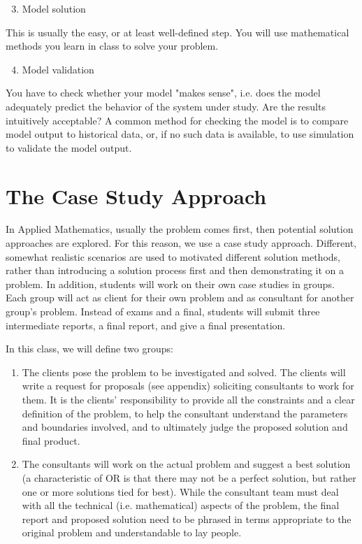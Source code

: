 \documentclass[10pt]{article}
\begin{document}
\begin{enumerate}
  \setcounter{enumi}{2}
  \item Model solution
\end{enumerate}
This is usually the easy, or at least well-defined step. You will use mathematical methods you learn in class to solve your problem.

\begin{enumerate}
  \setcounter{enumi}{3}
  \item Model validation
\end{enumerate}
You have to check whether your model "makes sense", i.e. does the model adequately predict the behavior of the system under study. Are the results intuitively acceptable? A common method for checking the model is to compare model output to historical data, or, if no such data is available, to use simulation to validate the model output.

\section{The Case Study Approach}
In Applied Mathematics, usually the problem comes first, then potential solution approaches are explored. For this reason, we use a case study approach. Different, somewhat realistic scenarios are used to motivated different solution methods, rather than introducing a solution process first and then demonstrating it on a problem. In addition, students will work on their own case studies in groups. Each group will act as client for their own problem and as consultant for another group's problem. Instead of exams and a final, students will submit three intermediate reports, a final report, and give a final presentation.

In this class, we will define two groups:

\begin{enumerate}
  \item The clients pose the problem to be investigated and solved. The clients will write a request for proposals (see appendix) soliciting consultants to work for them. It is the clients' responsibility to provide all the constraints and a clear definition of the problem, to help the consultant understand the parameters and boundaries involved, and to ultimately judge the proposed solution and final product.

  \item The consultants will work on the actual problem and suggest a best solution (a characteristic of OR is that there may not be a perfect solution, but rather one or more solutions tied for best). While the consultant team must deal with all the technical (i.e. mathematical) aspects of the problem, the final report and proposed solution need to be phrased in terms appropriate to the original problem and understandable to lay people.

\end{enumerate}
\end{document}
